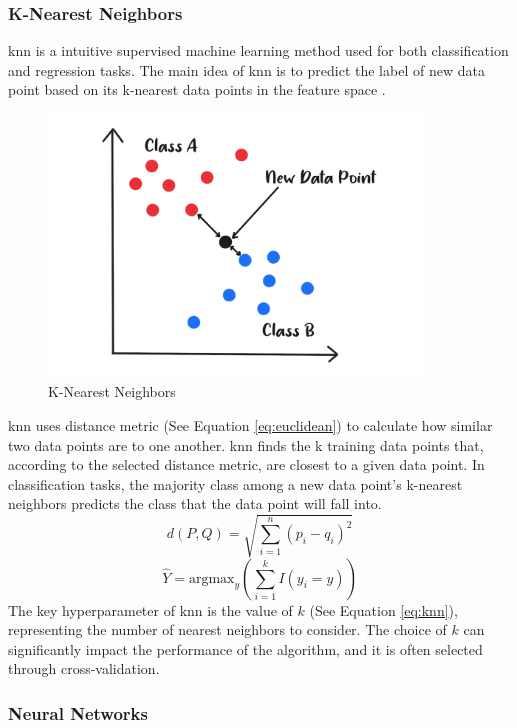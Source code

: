 \subsubsection{K-Nearest Neighbors}
\nocite{srivastava_2019_introduction}
\nocite{geeksforgeeks_2018_knearest}
\nocite{harrison_2018_machine}
\gls{knn} is a intuitive supervised machine learning method used for both classification and regression tasks. 
The main idea of \gls{knn} is to predict the label of new data point based on its k-nearest data points in the feature space \citep{ibm_what_knn}.
\begin{figure}[H]
    \centering
    \includegraphics[width=10cm]{Images/knn.png}
    \caption{K-Nearest Neighbors}
    \label{fig:knn}
\end{figure}
\indent \gls{knn} uses distance metric (See Equation \ref{eq:euclidean}) to calculate how similar two data points are to one another.
\gls{knn} finds the k training data points that, according to the selected distance metric, are closest to a given data point.
In classification tasks, the majority class among a new data point's k-nearest neighbors predicts the class that the data point will fall into.
\begin{equation} \label{eq:euclidean}
    d(P,Q) = \sqrt{\sum_{i=1}^{n}(p_{i} - q_{i})^{2}}
\end{equation}
\begin{equation} \label{eq:knn}
    \hat{Y} = \text{argmax}_y \left( \sum_{i=1}^{k}I(y_{i}=y) \right)
\end{equation}
\indent The key hyperparameter of \gls{knn} is the value of $k$ (See Equation \ref{eq:knn}), representing the number of nearest neighbors to consider.
The choice of $k$ can significantly impact the performance of the algorithm, and it is often selected through cross-validation.

\subsubsection{Neural Networks}
